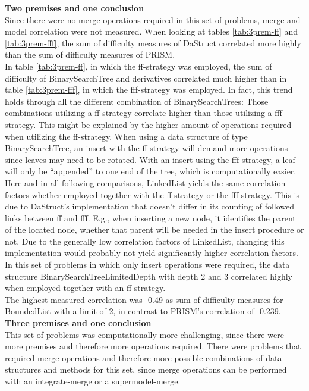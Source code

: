 \documentclass[hidelinks]{scrartcl}
\begin{document}
\textbf{Two premises and one conclusion} \\
Since there were no merge operations required in this set of problems, merge and model correlation were not measured. When looking at tables \ref{tab:3prem-ff} and \ref{tab:3prem-fff}, the sum of difficulty measures of DaStruct correlated more highly than the sum of difficulty measures of PRISM. \\
In table \ref{tab:3prem-ff}, in which the ff-strategy was employed, the sum of difficulty of BinarySearchTree and derivatives correlated much higher than in table \ref{tab:3prem-fff}, in which the fff-strategy was employed. In fact, this trend holds through all the different combination of BinarySearchTrees: Those combinations utilizing a ff-strategy correlate higher than those utilizing a fff-strategy. This might be explained by the higher amount of operations required when utilizing the ff-strategy. When using a data structure of type BinarySearchTree, an insert with the ff-strategy will demand more operations since leaves may need to be rotated. With an insert using the fff-strategy, a leaf will only be ``appended'' to one end of the tree, which is computationally easier. \\
Here and in all following comparisons, LinkedList yields the same correlation factors whether employed together with the ff-strategy or the fff-strategy. This is due to DaStruct's implementation that doesn't differ in its counting of followed links between ff and fff. E.g., when inserting a new node, it identifies the parent of the located node, whether that parent will be needed in the insert procedure or not. Due to the generally low correlation factors of LinkedList, changing this implementation would probably not yield significantly higher correlation factors. \\
In this set of problems in which only insert operations were required, the data structure BinarySearchTreeLimitedDepth with depth 2 and 3 correlated highly when employed together with an ff-strategy. \\
The highest measured correlation was -0.49 as sum of difficulty measures for BoundedList with a limit of 2, in contrast to PRISM's correlation of -0.239.  \\

\textbf{Three premises and one conclusion} \\
This set of problems was computationally more challenging, since there were more \gls{premise}s and therefore more operations required. There were problems that required merge operations and therefore more possible combinations of data structures and methods for this set, since merge operations can be performed with an integrate-merge or a supermodel-merge. \\
\end{document}
